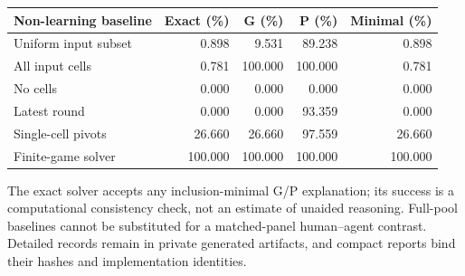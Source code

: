\begin{center}\begin{tabular}{lrrrr}
Non-learning baseline & Exact (\%) & G (\%) & P (\%) & Minimal (\%) \\ \hline
Uniform input subset & 0.898 & 9.531 & 89.238 & 0.898 \\
All input cells & 0.781 & 100.000 & 100.000 & 0.781 \\
No cells & 0.000 & 0.000 & 0.000 & 0.000 \\
Latest round & 0.000 & 0.000 & 93.359 & 0.000 \\
Single-cell pivots & 26.660 & 26.660 & 97.559 & 26.660 \\
Finite-game solver & 100.000 & 100.000 & 100.000 & 100.000 \\
\end{tabular}\end{center}

The exact solver accepts any inclusion-minimal G/P explanation; its success is a computational consistency check, not an estimate of unaided reasoning. Full-pool baselines cannot be substituted for a matched-panel human--agent contrast. Detailed records remain in private generated artifacts, and compact reports bind their hashes and implementation identities.

